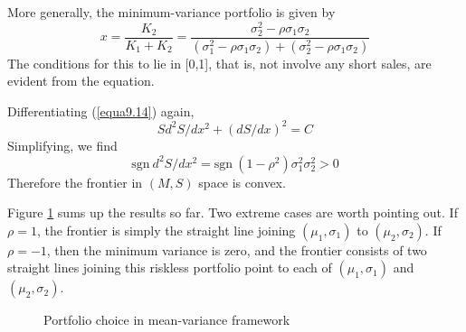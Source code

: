 More generally, the minimum-variance portfolio is given by 
\begin{equation*} 
x = \dfrac{K_2}{K_1 + K_2} = \dfrac{\sigma_2^2 - \rho \sigma_1 \sigma_2}{(\sigma_1^2 - \rho \sigma_1 \sigma_2) +(\sigma_2^2 - \rho \sigma_1 \sigma_2)}
\end{equation*} 
The conditions for this to lie in [0,1], that is, not involve any short sales, are evident from the equation.

Differentiating (\ref{equa9.14}) again,
\begin{equation*} 
S d^2 S /dx^2 + (dS / dx)^2 = C
\end{equation*}
Simplifying, we find 
\begin{equation*} 
\mbox{sgn} \ d^2 S / dx^2 = \mbox{sgn} \ (1- \rho^2) \sigma_1^2 \sigma_2^2 >0
\end{equation*}
Therefore the frontier in $(M,S)$ space is convex.

Figure \ref{Fig9.1} sums up the results so far. Two extreme cases are worth pointing out. If $\rho=1$, the frontier is simply the straight line joining $(\mu_1, \sigma_1)$ to $(\mu_2, \sigma_2)$. If $\rho=-1$, then the minimum variance is zero, and the frontier consists of two straight lines joining this riskless portfolio point to each of $(\mu_1, \sigma_1)$ and $(\mu_2, \sigma_2)$.

\begin{figure}[!htb] %
\centering %
\caption{Portfolio choice in mean-variance framework} %
\label{Fig9.1} %
\end{figure}

